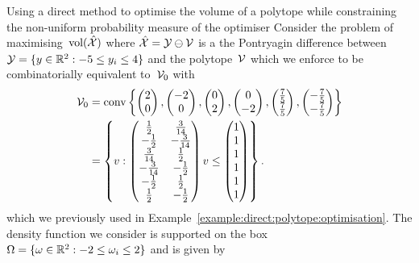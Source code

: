 \begin{example}{Using a direct method to optimise the volume of a polytope while constraining the non-uniform probability measure of the optimiser}\label{example:non:uniform}
Consider the problem of maximising~$\text{vol}(\hat{\mathcal X})$ where $\hat{\mathcal X}=\mathcal Y\ominus\mathcal V$ is a the Pontryagin difference between~$\mathcal Y=\{y\in\mathbb R^2:-5\leq y_i\leq 4\}$ and the polytope~$\mathcal V$ which we enforce to be combinatorially equivalent to~$\mathcal V_0$ with
%
$$
\begin{aligned}
\mathcal V_0 &= \text{conv}\left\{\begin{pmatrix}2\\0\end{pmatrix},\begin{pmatrix}-2\\0\end{pmatrix},\begin{pmatrix}0\\2\end{pmatrix},\begin{pmatrix}0\\-2\end{pmatrix},\begin{pmatrix}\frac{7}{5}\\\frac{7}{5}\end{pmatrix},\begin{pmatrix}-\frac{7}{5}\\-\frac{7}{5}\end{pmatrix}\right\}\\
 &= \left\{v:\begin{pmatrix}\frac{1}{2}&\frac{3}{14}\\ -\frac{1}{2}&-\frac{3}{14}\\ \frac{3}{14}&\frac{1}{2}\\ -\frac{3}{14}&-\frac{1}{2}\\ -\frac{1}{2}&\frac{1}{2} \\ \frac{1}{2}&-\frac{1}{2}\end{pmatrix}v\leq\begin{pmatrix}1\\1\\1\\1\\1\\1\end{pmatrix}\right\}.
\end{aligned}
$$
%
which we previously used in Example~\ref{example:direct:polytope:optimisation}.
%
The density function we consider is supported on the box~$\Omega = \{\omega\in\mathbb R^2:-2\leq\omega_i\leq2\}$ and is given by

\end{example}
